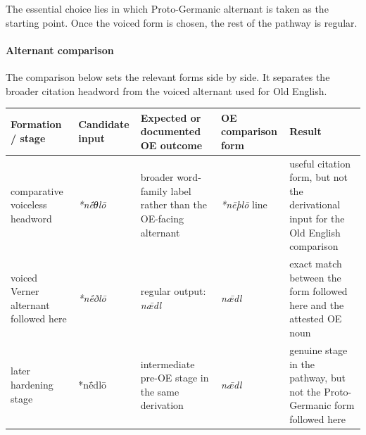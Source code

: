 \documentclass[
  british,
  a4paper,
]{article}
\newcounter{none} %
\begin{document}
The essential choice lies in which Proto-Germanic alternant is taken as
the starting point. Once the voiced form is chosen, the rest of the
pathway is regular.

\paragraph{Alternant comparison}\label{alternant-comparison}

The comparison below sets the relevant forms side by side. It separates
the broader citation headword from the voiced alternant used for Old
English.

{\def\LTcaptype{none} %
\begin{longtable}[]{@{}
  >{\raggedright\arraybackslash}p{}
  >{\raggedright\arraybackslash}p{}
  >{\raggedright\arraybackslash}p{}
  >{\raggedright\arraybackslash}p{}
  >{\raggedright\arraybackslash}p{}@{}}
\toprule\noalign{}
\begin{minipage}[b]{\linewidth}\raggedright
Formation / stage
\end{minipage} & \begin{minipage}[b]{\linewidth}\raggedright
Candidate input
\end{minipage} & \begin{minipage}[b]{\linewidth}\raggedright
Expected or documented OE outcome
\end{minipage} & \begin{minipage}[b]{\linewidth}\raggedright
OE comparison form
\end{minipage} & \begin{minipage}[b]{\linewidth}\raggedright
Result
\end{minipage} \\
\midrule\noalign{}
\endhead
\bottomrule\noalign{}
\endlastfoot
comparative voiceless headword & {\emph{*nḗθlō}} & broader word-family
label rather than the OE-facing alternant & \emph{*nēþlō} line & useful
citation form, but not the derivational input for the Old English
comparison \\
voiced Verner alternant followed here & {\emph{*nḗðlō}} & regular
output: {\emph{nǣdl}} & {\emph{nǣdl}} & exact match between the form
followed here and the attested OE noun \\
later hardening stage & *nḗdlō & intermediate pre-OE stage in the same
derivation & \emph{nǣdl} & genuine stage in the pathway, but not the
Proto-Germanic form followed here \\
\end{longtable}
}
\end{document}
